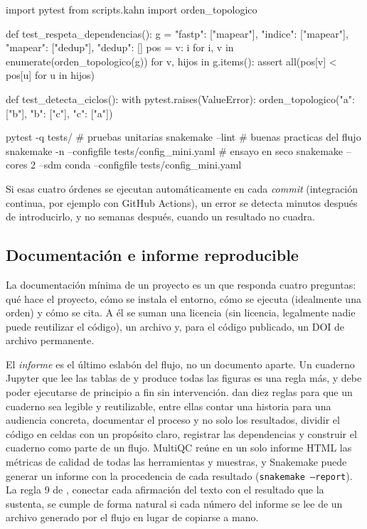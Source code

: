 \begin{codigo}
import pytest
from scripts.kahn import orden_topologico

def test_respeta_dependencias():
    g = {"fastp": ["mapear"], "indice": ["mapear"],
         "mapear": ["dedup"], "dedup": []}
    pos = {v: i for i, v in enumerate(orden_topologico(g))}
    for v, hijos in g.items():
        assert all(pos[v] < pos[u] for u in hijos)

def test_detecta_ciclos():
    with pytest.raises(ValueError):
        orden_topologico({"a": ["b"], "b": ["c"], "c": ["a"]})
\end{codigo}

\begin{consola}
pytest -q tests/                          # pruebas unitarias
snakemake --lint                          # buenas practicas del flujo
snakemake -n --configfile tests/config_mini.yaml       # ensayo en seco
snakemake --cores 2 --sdm conda --configfile tests/config_mini.yaml
\end{consola}

Si esas cuatro órdenes se ejecutan automáticamente en cada \emph{commit} (integración continua, por ejemplo con GitHub Actions), un error se detecta minutos después de introducirlo, y no semanas después, cuando un resultado no cuadra.

\subsection{Documentación e informe reproducible}

La documentación mínima de un proyecto es un  que responda cuatro preguntas: qué hace el proyecto, cómo se instala el entorno, cómo se ejecuta (idealmente una orden) y cómo se cita. A él se suman una licencia (sin licencia, legalmente nadie puede reutilizar el código), un archivo  y, para el código publicado, un DOI de archivo permanente.

El \emph{informe} es el último eslabón del flujo, no un documento aparte. Un cuaderno Jupyter que lee las tablas de  y produce todas las figuras es una regla más, y debe poder ejecutarse de principio a fin sin intervención. \textcite{c18-rule2019} dan diez reglas para que un cuaderno sea legible y reutilizable, entre ellas contar una historia para una audiencia concreta, documentar el proceso y no solo los resultados, dividir el código en celdas con un propósito claro, registrar las dependencias y construir el cuaderno como parte de un flujo. MultiQC \parencite{c18-ewels2016} reúne en un solo informe HTML las métricas de calidad de todas las herramientas y muestras, y Snakemake puede generar un informe con la procedencia de cada resultado (\texttt{snakemake --report}). La regla 9 de \textcite{c18-sandve2013}, conectar cada afirmación del texto con el resultado que la sustenta, se cumple de forma natural si cada número del informe se lee de un archivo generado por el flujo en lugar de copiarse a mano.

